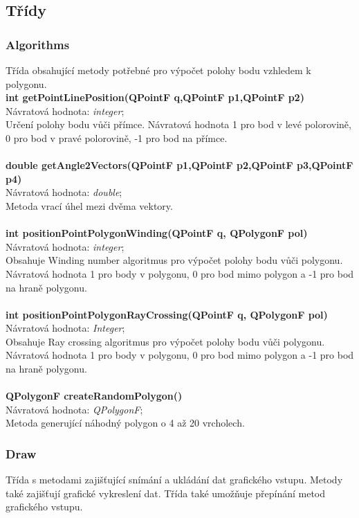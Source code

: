 \documentclass[a4paper, 12pt]{article}
\begin{document}
\subsection{Třídy}
\subsubsection{Algorithms}
Třída obsahující metody potřebné pro výpočet polohy bodu vzhledem k polygonu.
\\

\textbf{int getPointLinePosition(QPointF q,QPointF p1,QPointF p2)}\\
Návratová hodnota: \textit{integer};\\
Určení polohy bodu vůči přímce. Návratová hodnota
1 pro bod v levé polorovině, 0 pro bod v pravé
polorovině, -1 pro bod na přímce.\\
\\

\textbf{double getAngle2Vectors(QPointF p1,QPointF p2,QPointF p3,QPointF p4)}\\
Návratová hodnota: \textit{double};\\
Metoda vrací úhel mezi dvěma vektory.\\
\\

\textbf{int positionPointPolygonWinding(QPointF q, QPolygonF pol)}\\
Návratová hodnota: \textit{integer};\\
Obsahuje Winding number algoritmus pro
výpočet polohy bodu vůči polygonu.
Návratová hodnota 1 pro body v polygonu, 0
pro bod mimo polygon a -1 pro bod na hraně
polygonu.\\
\\

\textbf{int positionPointPolygonRayCrossing(QPointF q, QPolygonF pol)}\\
Návratová hodnota: \textit{Integer};\\
Obsahuje Ray crossing algoritmus pro
výpočet polohy bodu vůči polygonu.
Návratová hodnota 1 pro body v polygonu, 0
pro bod mimo polygon a -1 pro bod na hraně
polygonu.\\
\\

\textbf{QPolygonF createRandomPolygon()}\\
Návratová hodnota: \textit{QPolygonF};\\
Metoda generující náhodný polygon o 4 až 20
vrcholech.

\subsubsection{Draw}
Třída s metodami zajišťující snímání a ukládání dat grafického vstupu. Metody také zajišťují grafické vykreslení dat. Třída také umožňuje přepínání metod grafického vstupu.
\end{document}
